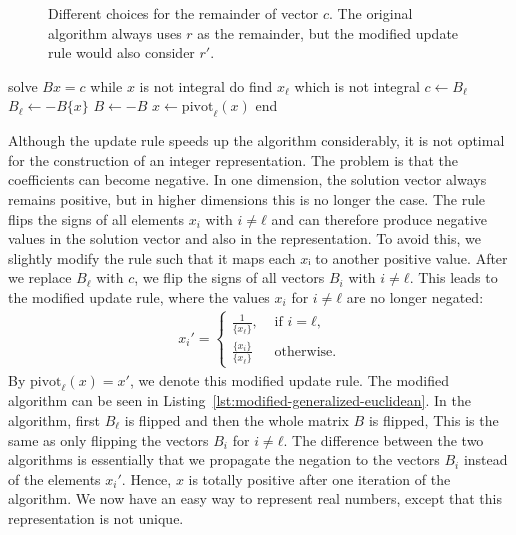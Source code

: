 
\begin{figure}[tbp]
  \centering
  
  \caption{
    Different choices for the remainder of vector $c$. The original algorithm
    always uses $r$ as the remainder, but the modified update rule would also consider $r'$.}
\end{figure}

\begin{Pseudocode}[
    float=tbp,
    label={lst:modified-generalized-euclidean},
    caption={
      The modified algorithm, where the solution $x$ remains entirely positive in each iterations.
      The linear system from the original algorithm is replaced by the update rule.
      The two negations ensure that the vectors represent the correct solution,
      when the modified update rule from Equation~\ref{eq:modified-update-rule} is used.
    }]
solve $Bx = c$
while $x$ is not integral do
  find $x_ℓ$ which is not integral
  $c ← B_ℓ$
  $B_ℓ ← -B\{x\}$
  $B ← -B$
  $x ← \mathrm{pivot}_ℓ(x)$
end
\end{Pseudocode}

Although the update rule speeds up the algorithm considerably, it is not
optimal for the construction of an integer representation.
The problem is that the coefficients can become negative.
In one dimension, the solution vector always remains positive,
but in higher dimensions this is no longer the case.
The rule flips the signs of all elements $x_i$ with $i ≠ ℓ$
and can therefore produce negative values in the solution vector and also in the representation.
To avoid this, we slightly modify the rule such that it maps each $xᵢ$ to another positive value.
After we replace $B_ℓ$ with $c$, we flip the signs of all vectors $B_i$ with $i ≠ ℓ$.
This leads to the modified update rule, where the values $x_i$ for $i ≠ ℓ$ are
no longer negated:
\begin{align}
  \label{eq:modified-update-rule}
  x_i' =
  \begin{cases}
    \frac{1}{\{x_ℓ\}},  & \text{ if } i = ℓ, \\
    \frac{\{x_i\}}{\{x_ℓ\}} & \text{ otherwise.}
  \end{cases}
\end{align}
By $\mathrm{pivot}_ℓ(x) = x'$, we denote this modified update rule.
The modified algorithm can be seen in Listing~\ref{lst:modified-generalized-euclidean}.
In the algorithm, first $B_ℓ$ is flipped and then the whole matrix $B$ is flipped,
This is the same as only flipping the vectors $B_i$ for $i ≠ ℓ$.
The difference between the two algorithms is essentially that we propagate the
negation to the vectors $B_i$ instead of the elements $x_i'$.
Hence, $x$ is totally positive after one iteration of the algorithm.
We now have an easy way to represent real numbers,
except that this representation is not unique.

